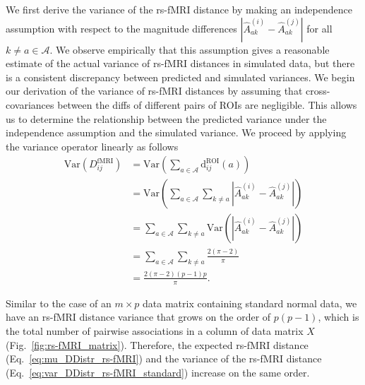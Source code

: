 \documentclass[10pt,letterpaper]{article}
\begin{document}
We first derive the variance of the rs-fMRI distance by making an independence assumption with respect to the magnitude differences $|\hat{A}^{(i)}_{ak} - \hat{A}^{(j)}_{ak}|$ for all $k \neq a \in \mathcal{A}$. We observe empirically that this assumption gives a reasonable estimate of the actual variance of rs-fMRI distances in simulated data, but there is a consistent discrepancy between predicted and simulated variances. We begin our derivation of the variance of rs-fMRI distances by assuming that cross-covariances between the diffs of different pairs of ROIs are negligible. This allows us to determine the relationship between the predicted variance under the independence assumption and the simulated variance. We proceed by applying the variance operator linearly as follows
%
\begin{equation}\label{eq:var_DDistr_rs-fMRI_standard}
\begin{aligned}
\text{Var}(D^\text{fMRI}_{ij}) &= \text{Var}\left(\sum_{a \in \mathcal{A}} \text{d}^\text{ROI}_{ij}(a)\right) \\
&= \text{Var}\left(\sum_{a \in \mathcal{A}} \sum_{k \neq a} \left|\hat{A}^{(i)}_{ak} - \hat{A}^{(j)}_{ak}\right|\right) \\
&= \sum_{a \in \mathcal{A}} \sum_{k \neq a} \text{Var}\left(\left|\hat{A}^{(i)}_{ak} - \hat{A}^{(j)}_{ak}\right|\right) \\
&= \sum_{a \in \mathcal{A}} \sum_{k \neq a} \frac{2(\pi - 2)}{\pi} \\
&= \frac{2(\pi - 2)(p-1)p}{\pi}.
\end{aligned}
\end{equation}

Similar to the case of an $m \times p$ data matrix containing standard normal data, we have an rs-fMRI distance variance that grows on the order of $p(p - 1)$, which is the total number of pairwise associations in a column of data matrix $X$ (Fig.~\ref{fig:rs-fMRI_matrix}). Therefore, the expected rs-fMRI distance (Eq.~\ref{eq:mu_DDistr_rs-fMRI}) and the variance of the rs-fMRI distance (Eq.~\ref{eq:var_DDistr_rs-fMRI_standard}) increase on the same order.
\end{document}
